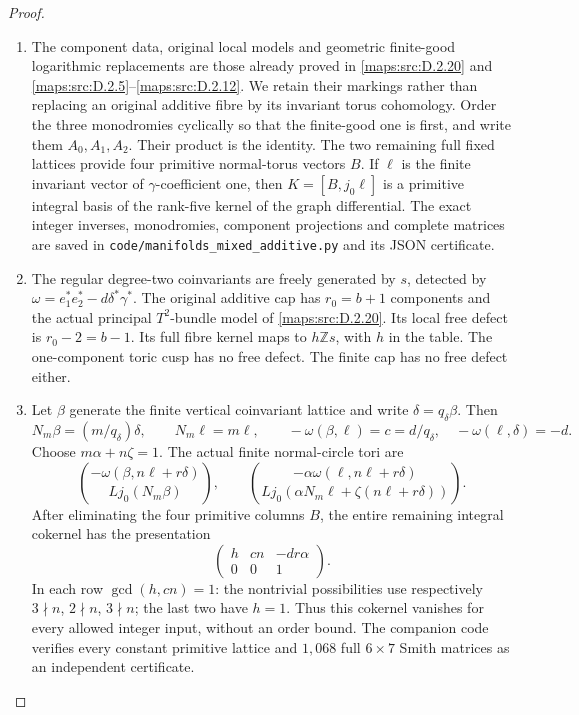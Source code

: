 \begin{proof}
\begin{enumerate}[label=\arabic*.,leftmargin=*]
\item The component data, original local models and geometric
finite-good logarithmic replacements are those already proved in
\ref{maps:src:D.2.20} and \ref{maps:src:D.2.5}--\ref{maps:src:D.2.12}. We retain their markings rather than replacing
an original additive fibre by its invariant torus cohomology. Order the
three monodromies cyclically so that the finite-good one is first, and
write them $A_0,A_1,A_2$. Their product is the identity. The two remaining
full fixed lattices provide four primitive normal-torus vectors $B$.
If $\ell$ is the finite invariant vector of $\gamma$-coefficient one,
then $K=[B,j_0\ell]$ is a primitive integral basis of the rank-five
kernel of the graph differential. The exact integer inverses, monodromies,
component projections and complete matrices are saved in
\texttt{code/manifolds\_mixed\_additive.py} and its JSON certificate.

\item The regular degree-two coinvariants are freely generated by $s$, detected
by $\omega=e_1^*e_2^*-d\delta^*\gamma^*$. The original additive cap has
$r_0=b+1$ components and the actual principal $T^2$-bundle model of
\ref{maps:src:D.2.20}. Its local free defect is $r_0-2=b-1$. Its full fibre kernel maps
to $h\mathbb Zs$, with $h$ in the table. The one-component toric cusp
has no free defect. The finite cap has no free defect either.

\item Let $\beta$ generate the finite vertical coinvariant lattice and write
$\delta=q_\delta\beta$. Then
\[
 N_m\beta=(m/q_\delta)\delta,\qquad N_m\ell=m\ell,
 \qquad -\omega(\beta,\ell)=c=d/q_\delta,\quad
 -\omega(\ell,\delta)=-d.
\]
Choose $m\alpha+n\zeta=1$. The actual finite normal-circle tori are
\[
 \binom{-\omega(\beta,n\ell+r\delta)}{Lj_0(N_m\beta)},\qquad
 \binom{-\alpha\omega(\ell,n\ell+r\delta)}
 {Lj_0(\alpha N_m\ell+\zeta(n\ell+r\delta))}.
\]
After eliminating the four primitive columns $B$, the entire remaining
integral cokernel has the presentation
\[
                 \begin{pmatrix}h&cn&-dr\alpha\\0&0&1\end{pmatrix}.
\]
In each row $\gcd(h,cn)=1$: the nontrivial possibilities use respectively
$3\nmid n$, $2\nmid n$, $3\nmid n$; the last two have $h=1$.
Thus this cokernel vanishes for every allowed integer input, without an
order bound. The companion code verifies every constant primitive lattice
and $1,068$ full $6\times7$ Smith matrices as an independent certificate.


\end{enumerate}
\end{proof}
